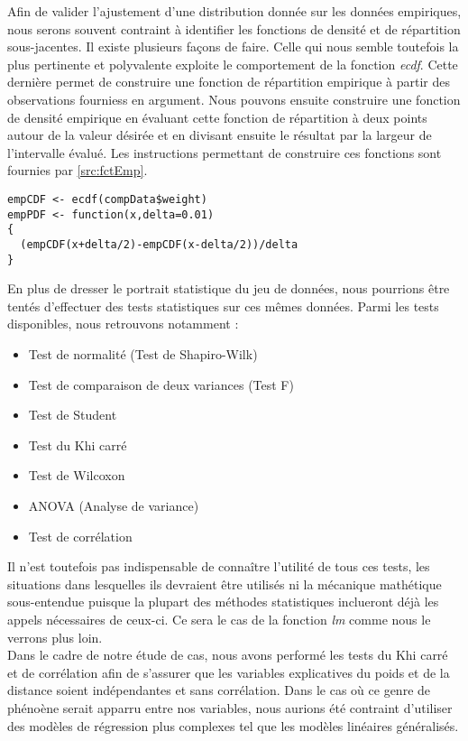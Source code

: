 \noindent
Afin de valider l'ajustement d'une distribution donnée sur les données empiriques, nous serons souvent contraint à identifier les fonctions de densité et de répartition sous-jacentes. Il existe plusieurs façons de faire. Celle qui nous semble toutefois la plus pertinente et polyvalente exploite le comportement de la fonction \emph{ecdf}. Cette dernière permet de construire une fonction de répartition empirique à partir des observations fourniess en argument. Nous pouvons ensuite construire une fonction de densité empirique en évaluant cette fonction de répartition à deux points autour de la valeur désirée et en divisant ensuite le résultat par la largeur de l'intervalle évalué. Les instructions permettant de construire ces fonctions sont fournies par \autoref{src:fctEmp}. \\

\begin{lstlisting}[caption = Fonctions de densité et de répartition empiriques,label=src:fctEmp]
empCDF <- ecdf(compData$weight)
empPDF <- function(x,delta=0.01)
{
  (empCDF(x+delta/2)-empCDF(x-delta/2))/delta
}
\end{lstlisting}

\vspace{\baselineskip}
\noindent
En plus de dresser le portrait statistique du jeu de données, nous pourrions être tentés d'effectuer des tests statistiques sur ces mêmes données. Parmi les tests disponibles, nous retrouvons notamment :
\begin{itemize}
	\item Test de normalité (Test de Shapiro-Wilk)
	\item Test de comparaison de deux variances (Test F)
	\item Test de Student
	\item Test du Khi carré
	\item Test de Wilcoxon
	\item ANOVA (Analyse de variance)
	\item Test de corrélation
\end{itemize}
Il n'est toutefois pas indispensable de connaître l'utilité de tous ces tests, les situations dans lesquelles ils devraient être utilisés ni la mécanique mathétique sous-entendue puisque la plupart des méthodes statistiques inclueront déjà les appels nécessaires de ceux-ci. Ce sera le cas de la fonction \emph{lm} comme nous le verrons plus loin. \cite{testStatsR} \\

\noindent
Dans le cadre de notre étude de cas, nous avons performé les tests du Khi carré et de corrélation afin de s'assurer que les variables explicatives du poids et de la distance soient indépendantes et sans corrélation. Dans le cas où ce genre de phénoène serait apparru entre nos variables, nous aurions été contraint d'utiliser des modèles de régression plus complexes tel que les modèles linéaires généralisés. \\

